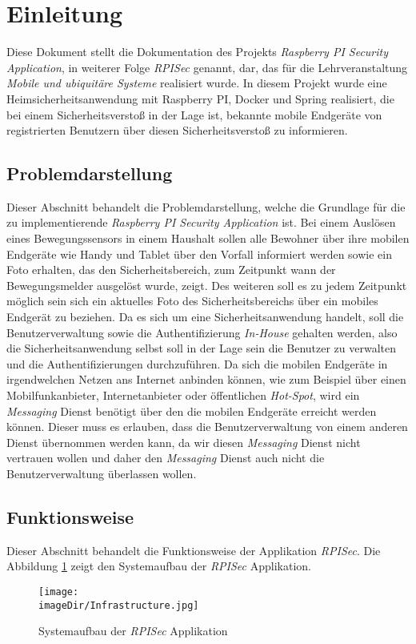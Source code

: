 \section{Einleitung}
Diese Dokument stellt die Dokumentation des Projekts \emph{Raspberry PI Security Application}, in weiterer Folge \emph{RPISec} genannt, dar, das für die Lehrveranstaltung \emph{Mobile und ubiquitäre Systeme} realisiert wurde. In diesem Projekt wurde eine Heimsicherheitsanwendung mit Raspberry PI, Docker und Spring realisiert, die bei einem Sicherheitsverstoß in der Lage ist, bekannte mobile Endgeräte von registrierten Benutzern über diesen Sicherheitsverstoß zu informieren. 

\subsection{Problemdarstellung}
Dieser Abschnitt behandelt die Problemdarstellung, welche die Grundlage für die zu implementierende \emph{Raspberry PI Security Application} ist. Bei einem Auslösen eines Bewegungssensors in einem Haushalt sollen alle Bewohner über ihre mobilen Endgeräte wie Handy und Tablet über den Vorfall informiert werden sowie ein Foto erhalten, das den Sicherheitsbereich, zum Zeitpunkt wann der Bewegungsmelder ausgelöst wurde, zeigt. Des weiteren soll es zu jedem Zeitpunkt möglich sein sich ein aktuelles Foto des Sicherheitsbereichs über ein mobiles Endgerät zu beziehen.  
\newline
\newline
Da es sich um eine Sicherheitsanwendung handelt, soll die Benutzerverwaltung sowie die Authentifizierung \emph{In-House} gehalten werden, also die Sicherheitsanwendung selbst soll in der Lage sein die Benutzer zu verwalten und die Authentifizierungen durchzuführen. Da sich die mobilen Endgeräte in irgendwelchen Netzen ans Internet anbinden können, wie zum Beispiel über einen Mobilfunkanbieter, Internetanbieter oder öffentlichen \emph{Hot-Spot}, wird ein \emph{Messaging} Dienst benötigt über den die mobilen Endgeräte erreicht werden können. Dieser muss es erlauben, dass die Benutzerverwaltung von einem anderen Dienst übernommen werden kann, da wir diesen \emph{Messaging} Dienst nicht vertrauen wollen und daher den \emph{Messaging} Dienst auch nicht die Benutzerverwaltung überlassen wollen.


\subsection{Funktionsweise}
Dieser Abschnitt behandelt die Funktionsweise der Applikation \emph{RPISec}. Die Abbildung \ref{fig:image-system-structure} zeigt den Systemaufbau der \emph{RPISec} Applikation. 
\begin{figure}[h]
	\centering
	\texttt{[image: \\imageDir/Infrastructure.jpg]}
	\caption{Systemaufbau der \emph{RPISec} Applikation}
	\label{fig:image-system-structure}
\end{figure}
\ \newpage

